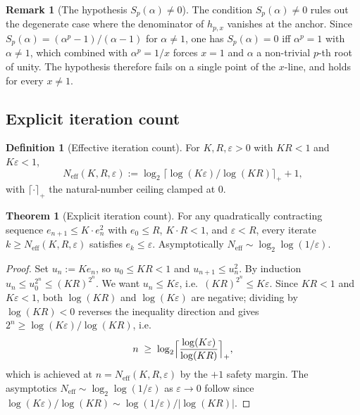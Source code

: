 \documentclass[11pt,a4paper]{article}
\theoremstyle{definition}
\newtheorem{definition}{Definition}[section]
\newtheorem{theorem}{Theorem}[section]
\newtheorem{remark}{Remark}[section]
\begin{document}
\begin{remark}[The hypothesis $S_p(\alpha) \neq 0$]
The condition $S_p(\alpha) \neq 0$ rules out the degenerate case where the denominator of $h_{p,x}$ vanishes at the anchor. Since $S_p(\alpha) = (\alpha^p - 1)/(\alpha - 1)$ for $\alpha \neq 1$, one has $S_p(\alpha) = 0$ iff $\alpha^p = 1$ with $\alpha \neq 1$, which combined with $\alpha^p = 1/x$ forces $x = 1$ and $\alpha$ a non-trivial $p$-th root of unity. The hypothesis therefore fails on a single point of the $x$-line, and holds for every $x \neq 1$.
\end{remark}

\subsection{Explicit iteration count}

\begin{definition}[Effective iteration count]
For $K, R, \varepsilon > 0$ with $K R < 1$ and $K \varepsilon < 1$,
\[
  N_{\mathrm{eff}}(K, R, \varepsilon) :=
  \log_2 \big\lceil \log(K \varepsilon) / \log(K R) \big\rceil_+ + 1,
\]
with $\lceil \cdot \rceil_+$ the natural-number ceiling clamped at $0$.
\end{definition}

\begin{theorem}[Explicit iteration count]\label{thm:eff-kt}
For any quadratically contracting sequence $e_{n+1} \leq K \cdot e_n^2$
with $e_0 \leq R$, $K \cdot R < 1$, and $\varepsilon < R$, every iterate
$k \geq N_{\mathrm{eff}}(K, R, \varepsilon)$ satisfies $e_k \leq \varepsilon$.
Asymptotically $N_{\mathrm{eff}} \sim \log_2 \log(1/\varepsilon)$.
\end{theorem}

\begin{proof}
Set $u_n := K e_n$, so $u_0 \leq KR < 1$ and $u_{n+1} \leq u_n^2$. By induction $u_n \leq u_0^{2^n} \leq (KR)^{2^n}$. We want $u_n \leq K\varepsilon$, i.e.\ $(KR)^{2^n} \leq K\varepsilon$. Since $KR < 1$ and $K\varepsilon < 1$, both $\log(KR)$ and $\log(K\varepsilon)$ are negative; dividing by $\log(KR) < 0$ reverses the inequality direction and gives $2^n \geq \log(K\varepsilon)/\log(KR)$, i.e.\
\[
  n \;\geq\; \log_2 \Bigl\lceil \frac{\log(K\varepsilon)}{\log(KR)} \Bigr\rceil_+,
\]
which is achieved at $n = N_{\mathrm{eff}}(K, R, \varepsilon)$ by the $+1$ safety margin. The asymptotics $N_{\mathrm{eff}} \sim \log_2\log(1/\varepsilon)$ as $\varepsilon \to 0$ follow since $\log(K\varepsilon)/\log(KR) \sim \log(1/\varepsilon)/|\log(KR)|$.
\end{proof}
\end{document}
